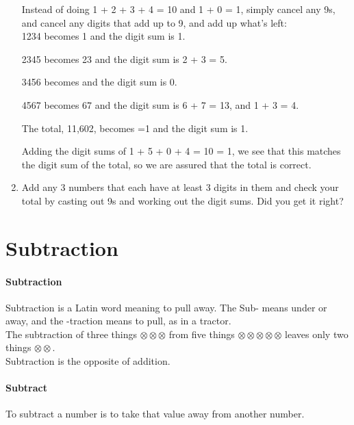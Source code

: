 \documentclass[12pt]{article}
\begin{document}
\begin{enumerate}
Instead of doing 1 + 2 + 3 + 4 = 10 and 1 + 0 = 1, simply cancel any 9s, and cancel any digits that add up to 9, and add up what's left:\\

1234 becomes 1 and the digit sum is 1.

\vspace{7pt}
2345 becomes 23 and the digit sum is 2 + 3 = 5.

\vspace{7pt}
3456 becomes  and the digit sum is 0.

\vspace{7pt}
4567 becomes 67	and the digit sum is 6 + 7 = 13, and 1 + 3 = 4.

\vspace{7pt}
The total, 11,602, becomes =1 and the digit sum is 1.

\vspace{7pt}
Adding the digit sums of 1 + 5 + 0 + 4 = 10 = 1, we see that this matches the digit sum of the total, so we are assured that the total is correct.

\item Add any 3 numbers that each have at least 3 digits in them and check your total by casting out 9s and working out the digit sums. Did you get it right?

\end{enumerate}

\section*{Subtraction}

\paragraph{Subtraction}
Subtraction is a Latin word meaning to pull away. The Sub- means under or away, and the -traction means to pull, as in a tractor.\\

The subtraction of three things $\otimes\otimes\otimes$ from five things $\otimes\otimes\otimes\otimes\otimes$ leaves only two things $\otimes\otimes$.\\

Subtraction is the opposite of addition.

\paragraph{Subtract}
To subtract a number is to take that value away from another number.\\
\end{document}
